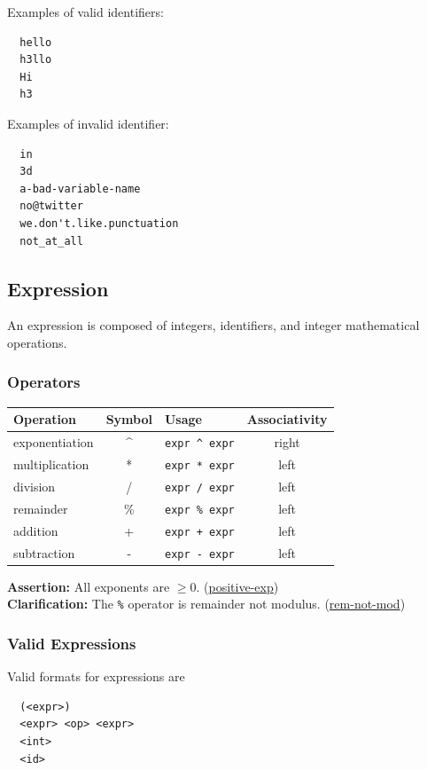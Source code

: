 \documentclass{article}
\newcommand{\code}[1]{\texttt{\textmd{#1}}}
\newcommand{\assertion}[2]{\textbf{Assertion: }#1 (\hyperlink{#2}{#2})}
\newcommand{\clarification}[2]{\textbf{Clarification: }#1 (\hyperlink{#2}{#2})}
\begin{document}
Examples of valid identifiers:
\begin{lstlisting}
  hello
  h3llo
  Hi
  h3
\end{lstlisting}

Examples of invalid identifier:
\begin{lstlisting}
  in
  3d
  a-bad-variable-name
  no@twitter
  we.don't.like.punctuation
  not_at_all
\end{lstlisting}\subsection{Expression}
An expression is composed of integers, identifiers, and integer mathematical operations.

\subsubsection{Operators}
\begin{center}
  \begin{tabular}{|l|c|l|c|}
    \hline
    \textbf{Operation} & \textbf{Symbol} & \textbf{Usage} &
    \textbf{Associativity} \\
    \hline
    exponentiation & \textasciicircum & \code{expr \textasciicircum\ expr} & right\\
    multiplication & *  & \code{expr * expr}  & left \\
    division       & /  & \code{expr / expr}  & left \\
    remainder      & \% & \code{expr \% expr}  & left \\
    addition       & +  & \code{expr + expr}  & left \\
    subtraction    & -  & \code{expr - expr}  & left \\
    \hline
  \end{tabular}
\end{center}

\assertion{All exponents are $\geq 0$.}{positive-exp}\\
\clarification{The \code{\%} operator is remainder not modulus.}{rem-not-mod}

\subsubsection{Valid Expressions}
Valid formats for expressions are
\begin{lstlisting}
  (<expr>)
  <expr> <op> <expr>
  <int>
  <id>
\end{lstlisting}
\end{document}
